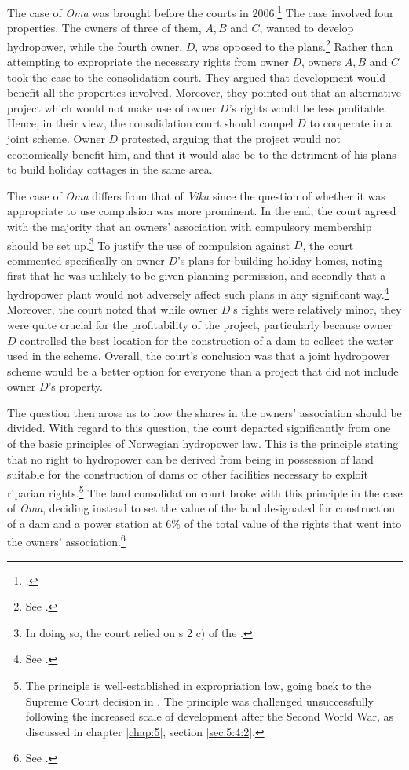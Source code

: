 The case of \emph{Oma} was brought before the courts in 2006.\footcite{oma06} The case involved four properties. The owners of three of them, $A,B$ and $C$, wanted to develop hydropower, while the fourth owner, $D$, was opposed to the plans.\footnote{See \cite[36-39]{stokstad11}.} Rather than attempting to expropriate the necessary rights from owner $D$, owners $A,B$ and $C$ took the case to the consolidation court. They argued that development would benefit all the properties involved. Moreover, they pointed out that an alternative project which would not make use of owner $D$'s rights would be less profitable. Hence, in their view, the consolidation court should compel $D$ to cooperate in a joint scheme. Owner $D$ protested, arguing that the project would not economically benefit him, and that it would also be to the detriment of his plans to build holiday cottages in the same area. 

The case of \emph{Oma} differs from that of \emph{Vika} since the question of whether it was appropriate to use compulsion was more prominent. In the end, the court agreed with the majority that an owners' association with compulsory membership should be set up.\footnote{In doing so, the court relied on s 2 c) of the \cite{lca79}.} To justify the use of compulsion against $D$, the court commented specifically on owner $D$'s plans for building holiday homes, noting first that he was unlikely to be given planning permission, and secondly that a hydropower plant would not adversely affect such plans in any significant way.\footnote{See \cite[36-37]{stokstad11}.} Moreover, the court noted that while owner $D$'s rights were relatively minor, they were quite crucial for the profitability of the project, particularly because owner $D$ controlled the best location for the construction of a dam to collect the water used in the scheme. Overall, the court's conclusion was that a joint hydropower scheme would be a better option for everyone than a project that did not include owner $D$'s property.

The question then arose as to how the shares in the owners' association should be divided. With regard to this question, the court departed significantly from one of the basic principles of Norwegian hydropower law. This is the principle stating that no right to hydropower can be derived from being in possession of land suitable for the construction of dams or other facilities necessary to exploit riparian rights.\footnote{The principle is well-established in expropriation law, going back to the Supreme Court decision in \cite{herlandsfossen22}. The principle was challenged unsuccessfully following the increased scale of development after the Second World War, as discussed in chapter \ref{chap:5}, section \ref{sec:5:4:2}.} The land consolidation court broke with this principle in the case of \emph{Oma}, deciding instead to set the value of the land designated for construction of a dam and a power station at $6 \%$ of the total value of the rights that went into the owners' association.\footnote{See \cite[36]{stokstad11}.}

